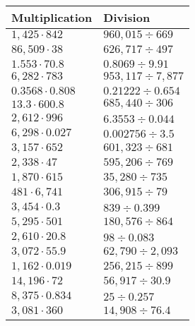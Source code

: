 \begin{longtable}[]{@{}ll@{}}
\toprule
Multiplication & Division\tabularnewline
\midrule
\endhead
\(1,425\cdot842\) & \(960,015÷669\)\tabularnewline
\(86,509\cdot38\) & \(626,717÷497\)\tabularnewline
\(1.553\cdot70.8\) & \(0.8069÷9.91\)\tabularnewline
\(6,282\cdot783\) & \(953,117÷7,877\)\tabularnewline
\(0.3568\cdot0.808\) & \(0.21222÷0.654\)\tabularnewline
\(13.3\cdot600.8\) & \(685,440÷306\)\tabularnewline
\(2,612\cdot996\) & \(6.3553÷0.044\)\tabularnewline
\(6,298\cdot0.027\) & \(0.002756÷3.5\)\tabularnewline
\(3,157\cdot652\) & \(601,323÷681\)\tabularnewline
\(2,338\cdot47\) & \(595,206÷769\)\tabularnewline
\(1,870\cdot615\) & \(35,280÷735\)\tabularnewline
\(481\cdot6,741\) & \(306,915÷79\)\tabularnewline
\(3,454\cdot0.3\) & \(839÷0.399\)\tabularnewline
\(5,295\cdot501\) & \(180,576÷864\)\tabularnewline
\(2,610\cdot20.8\) & \(98÷0.083\)\tabularnewline
\(3,072\cdot55.9\) & \(62,790÷2,093\)\tabularnewline
\(1,162\cdot0.019\) & \(256,215÷899\)\tabularnewline
\(14,196\cdot72\) & \(56,917÷30.9\)\tabularnewline
\(8,375\cdot0.834\) & \(25÷0.257\)\tabularnewline
\(3,081\cdot360\) & \(14,908÷76.4\)\tabularnewline
\bottomrule
\end{longtable}
